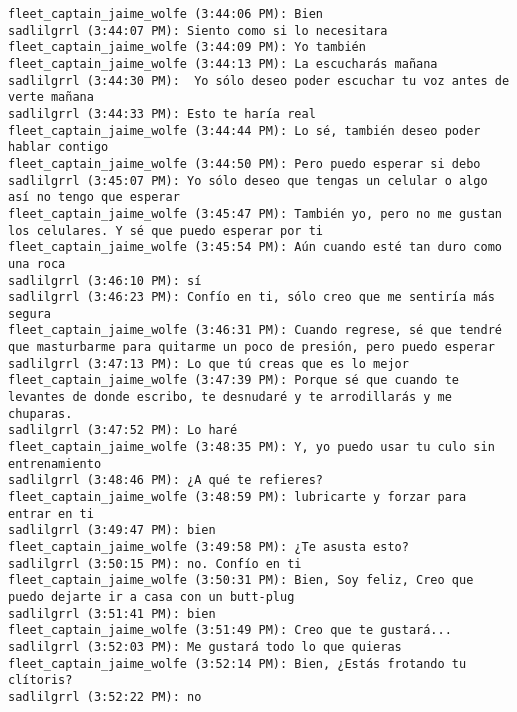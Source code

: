 \begin{verbatim}
fleet_captain_jaime_wolfe (3:44:06 PM): Bien
sadlilgrrl (3:44:07 PM): Siento como si lo necesitara
fleet_captain_jaime_wolfe (3:44:09 PM): Yo también
fleet_captain_jaime_wolfe (3:44:13 PM): La escucharás mañana
sadlilgrrl (3:44:30 PM):  Yo sólo deseo poder escuchar tu voz antes de verte mañana
sadlilgrrl (3:44:33 PM): Esto te haría real
fleet_captain_jaime_wolfe (3:44:44 PM): Lo sé, también deseo poder hablar contigo
fleet_captain_jaime_wolfe (3:44:50 PM): Pero puedo esperar si debo
sadlilgrrl (3:45:07 PM): Yo sólo deseo que tengas un celular o algo así no tengo que esperar
fleet_captain_jaime_wolfe (3:45:47 PM): También yo, pero no me gustan los celulares. Y sé que puedo esperar por ti
fleet_captain_jaime_wolfe (3:45:54 PM): Aún cuando esté tan duro como una roca
sadlilgrrl (3:46:10 PM): sí
sadlilgrrl (3:46:23 PM): Confío en ti, sólo creo que me sentiría más segura
fleet_captain_jaime_wolfe (3:46:31 PM): Cuando regrese, sé que tendré que masturbarme para quitarme un poco de presión, pero puedo esperar
sadlilgrrl (3:47:13 PM): Lo que tú creas que es lo mejor
fleet_captain_jaime_wolfe (3:47:39 PM): Porque sé que cuando te levantes de donde escribo, te desnudaré y te arrodillarás y me chuparas.
sadlilgrrl (3:47:52 PM): Lo haré
fleet_captain_jaime_wolfe (3:48:35 PM): Y, yo puedo usar tu culo sin entrenamiento
sadlilgrrl (3:48:46 PM): ¿A qué te refieres?
fleet_captain_jaime_wolfe (3:48:59 PM): lubricarte y forzar para entrar en ti
sadlilgrrl (3:49:47 PM): bien
fleet_captain_jaime_wolfe (3:49:58 PM): ¿Te asusta esto?
sadlilgrrl (3:50:15 PM): no. Confío en ti
fleet_captain_jaime_wolfe (3:50:31 PM): Bien, Soy feliz, Creo que puedo dejarte ir a casa con un butt-plug
sadlilgrrl (3:51:41 PM): bien
fleet_captain_jaime_wolfe (3:51:49 PM): Creo que te gustará...
sadlilgrrl (3:52:03 PM): Me gustará todo lo que quieras
fleet_captain_jaime_wolfe (3:52:14 PM): Bien, ¿Estás frotando tu clítoris?
sadlilgrrl (3:52:22 PM): no



\end{verbatim}
